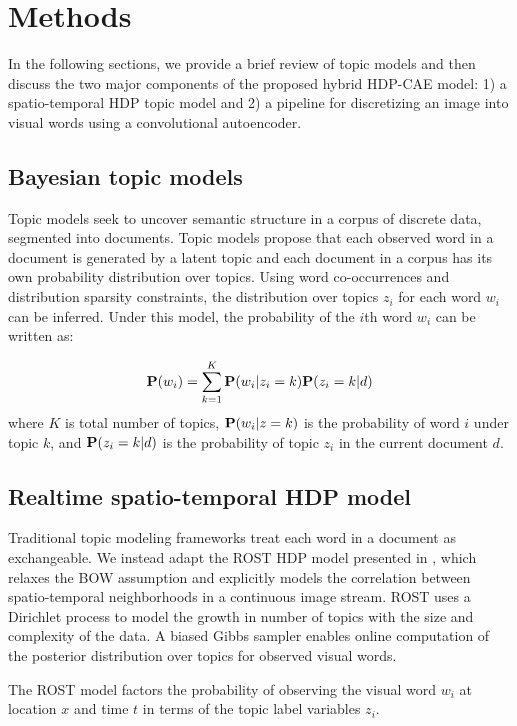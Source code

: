 \documentclass[letterpaper, 10 pt, conference]{ieeeconf}
\newcommand{\Prob} {\ensuremath \mathbf{P}  }
\begin{document}
\section{Methods}
\label{sec:approach}
 In the following sections, we provide a brief review of topic models and then discuss the two major components of the proposed hybrid HDP-CAE model: 1) a spatio-temporal HDP topic model and 2) a pipeline for discretizing an image into visual words using a convolutional autoencoder. 

\subsection{Bayesian topic models}
Topic models \cite{Blei2003, Griffiths:2004} seek to uncover semantic structure in a corpus of discrete data, segmented into documents. Topic models propose that each observed word in a document is generated by a latent topic and each document in a corpus has its own probability distribution over topics.  Using word co-occurrences and distribution sparsity constraints, the distribution over topics $z_i$ for each word $w_i$ can be inferred. Under this model, the probability of the $i$th word $w_i$ can be written as: 

\begin{equation}
    \Prob(w_i) = \sum_{k=1}^K \Prob(w_i| z_i = k) \Prob(z_i = k | d) 
\end{equation}
where $K$ is total number of topics, $\Prob(w_i | z = k)$ is the probability of word $i$ under topic $k$, and $\Prob(z_i = k | d)$ is the probability of topic $z_i$ in the current document $d$.

\subsection{Realtime spatio-temporal HDP model}
\label{sec:hdp}
Traditional topic modeling frameworks treat each word in a document as exchangeable. We instead adapt the ROST HDP model presented in \cite{Girdhar2015}, which relaxes the BOW assumption and explicitly models the correlation between spatio-temporal neighborhoods in a continuous image stream. ROST uses a Dirichlet process to model the growth in number of topics with the size and complexity of the data. A biased Gibbs sampler \cite{Girdhar2015Gibbs} enables online computation of the posterior distribution over topics for observed visual words.
    
The ROST model factors the probability of observing the visual word $w_i$ at location $x$ and time $t$ in terms of the topic label variables $z_i$. 
\end{document}
